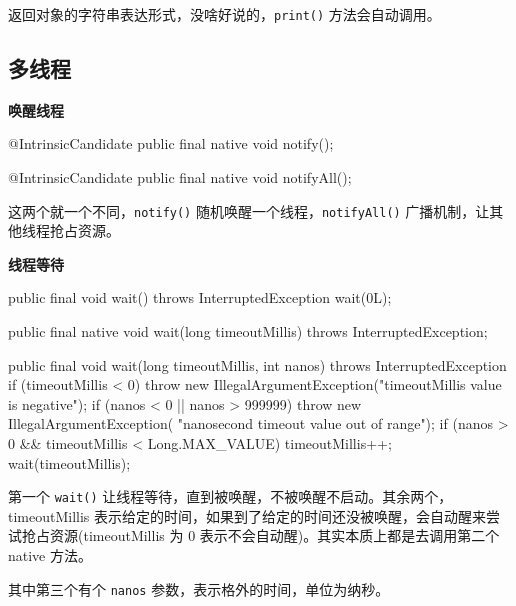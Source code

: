 返回对象的字符串表达形式，没啥好说的，\texttt{print()} 方法会自动调用。

\subsection{多线程}

\noindent\textbf{唤醒线程}

\begin{Java}
@IntrinsicCandidate
public final native void notify();

@IntrinsicCandidate
public final native void notifyAll();
\end{Java}

这两个就一个不同，\texttt{notify()} 随机唤醒一个线程，\texttt{notifyAll()} 广播机制，让其他线程抢占资源。

\noindent\textbf{线程等待}

\begin{Java}
public final void wait() throws InterruptedException { wait(0L); }

public final native void wait(long timeoutMillis) throws InterruptedException;

public final void wait(long timeoutMillis, int nanos) throws InterruptedException {
    if (timeoutMillis < 0)
        throw new IllegalArgumentException("timeoutMillis value is negative");
    if (nanos < 0 || nanos > 999999)
        throw new IllegalArgumentException( "nanosecond timeout value out of range");
    if (nanos > 0 && timeoutMillis < Long.MAX_VALUE)
        timeoutMillis++;
    wait(timeoutMillis);
}
\end{Java}

第一个 \texttt{wait()} 让线程等待，直到被唤醒，不被唤醒不启动。其余两个， timeoutMillis 表示给定的时间，如果到了给定的时间还没被唤醒，会自动醒来尝试抢占资源(timeoutMillis 为 0 表示不会自动醒)。其实本质上都是去调用第二个 native 方法。

其中第三个有个 \texttt{nanos} 参数，表示格外的时间，单位为纳秒。

\newpage